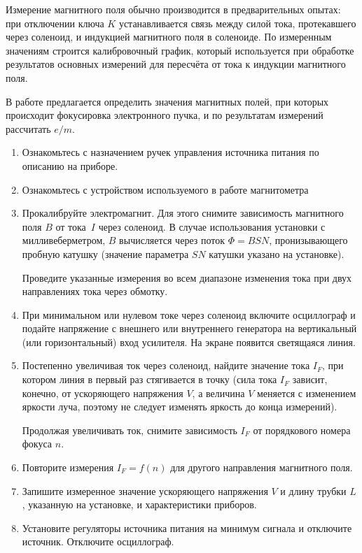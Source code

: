 Измерение магнитного поля обычно производится в предварительных опытах: при отключении ключа $K$ устанавливается связь между силой тока, протекавшего через соленоид, и индукцией магнитного поля в соленоиде. По измеренным значениям строится калибровочный график, который используется при обработке результатов основных измерений для пересчёта от тока к индукции магнитного поля.

\begin{lab:task}

В работе предлагается определить значения магнитных полей, при которых происходит фокусировка электронного пучка, и по результатам измерений рассчитать $e/m$.

\begin{enumerate}
\item{Ознакомьтесь с назначением ручек управления источника питания по описанию на приборе.}
\item{Ознакомьтесь с устройством используемого в работе магнитометра}
\item{Прокалибруйте электромагнит. Для этого снимите зависимость магнитного поля $B$ от тока~$I$ через соленоид.  В случае использования установки с милливеберметром, $B$ вычисляется через поток $\Phi=BSN$, пронизывающего пробную катушку (значение параметра $SN$ катушки указано на установке).

Проведите указанные измерения во всем диапазоне изменения тока при двух направлениях тока через обмотку.}
\item{При минимальном или нулевом токе через соленоид включите осциллограф  и подайте напряжение с внешнего или внутреннего генератора на вертикальный (или горизонтальный) вход усилителя. На экране появится светящаяся линия.}
\item{Постепенно увеличивая ток через соленоид, найдите значение тока $I_F$, при котором линия в первый раз стягивается в точку (сила тока $I_F$ зависит, конечно, от ускоряющего напряжения $V$, а величина $V$ меняется с изменением яркости луча, поэтому не следует изменять яркость до конца измерений).

Продолжая увеличивать ток, снимите зависимость $I_F$ от порядкового номера фокуса $n$.}
\item{ Повторите измерения $I_F=f(n)$ для другого направления магнитного поля.}
\item{ Запишите измеренное значение ускоряющего напряжения $V$ и длину трубки $L$, указанную на установке, и характеристики приборов.}
\item{Установите регуляторы источника питания на минимум сигнала и отключите источник. Отключите осциллограф.}
\end{enumerate}


\end{lab:task}
